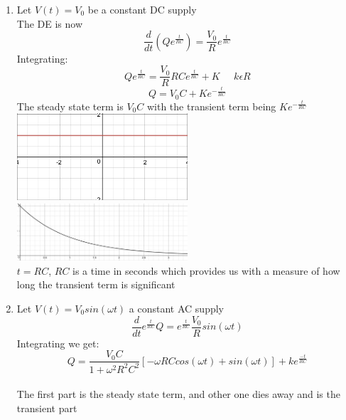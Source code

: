 \documentclass[11pt]{article}
\theoremstyle{definition}
\begin{document}
\begin{enumerate}
    \item Let $V(t) = V_0$ be a constant DC supply\\
    The DE is now
    $$\frac{d}{dt}(Qe^{\frac{t}{RC}}) = \frac{V_0}{R}e^{\frac{t}{RC}}$$
    Integrating:
    $$Qe^{\frac{t}{RC}} = \frac{V_0}{R}RCe^{\frac{t}{RC}} + K\;\;\;\;\;k \epsilon R$$
    $$Q = V_0C + Ke^{-\frac{t}{RC}}$$
    The steady state term is $V_0C$ with the transient term being $Ke^{-\frac{t}{RC}}$\\
    \includegraphics[width=0.5\textwidth]{constant.png}\\
    \includegraphics[width=0.5\textwidth]{etrc.png}\\
    $t = RC$, $RC$ is a time in seconds which provides us with a measure of how long the transient term is significant
    \item Let $V(t) = V_0sin(\omega t)$ a constant AC supply\\
    $$\frac{d}{dt}e^{\frac{t}{RC}}Q = e^{\frac{t}{RC}}\frac{V_0}{R}sin(\omega t)$$
    Integrating we get:
    $$Q = \frac{V_0C}{1+\omega^2R^2C^2} [-\omega RC cos(\omega t) + sin(\omega t)] + ke^{\frac{-t}{RC}}$$\\
    The first part is the steady state term, and other one dies away and is the transient part
\end{enumerate}
\newpage
\end{document}
